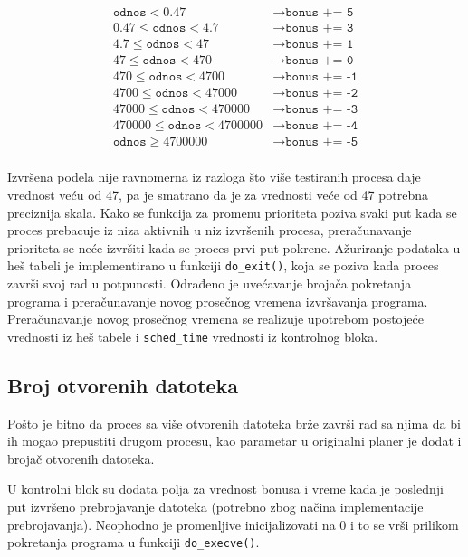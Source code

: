 \begin{align*}
    \texttt{odnos} < 0.47 & \rightarrow \texttt{bonus += 5} \\
    0.47 \leq \texttt{odnos} < 4.7 & \rightarrow \texttt{bonus += 3} \\
    4.7 \leq \texttt{odnos} < 47 & \rightarrow \texttt{bonus += 1} \\
    47 \leq \texttt{odnos} < 470 & \rightarrow \texttt{bonus += 0} \\
    470 \leq \texttt{odnos} < 4700 & \rightarrow \texttt{bonus += -1} \\
    4700 \leq \texttt{odnos} < 47000 & \rightarrow \texttt{bonus += -2} \\
    47000 \leq \texttt{odnos} < 470000 & \rightarrow \texttt{bonus += -3} \\
    470000 \leq \texttt{odnos} < 4700000 & \rightarrow \texttt{bonus += -4} \\
    \texttt{odnos} \geq 4700000 & \rightarrow \texttt{bonus += -5} \\
\end{align*}

Izvršena podela nije ravnomerna iz razloga što više testiranih procesa daje vrednost veću od
47, pa je smatrano da je za vrednosti veće od 47 potrebna preciznija skala. Kako se funkcija
za promenu prioriteta poziva svaki put kada se proces prebacuje iz niza aktivnih u niz
izvršenih procesa, preračunavanje prioriteta se neće izvršiti kada se proces prvi put pokrene.
Ažuriranje podataka u heš tabeli je implementirano u funkciji \verb|do_exit()|, koja se poziva
kada proces završi svoj rad u potpunosti. Odrađeno je uvećavanje brojača pokretanja
programa i preračunavanje novog prosečnog vremena izvršavanja programa. Preračunavanje
novog prosečnog vremena se realizuje upotrebom postojeće vrednosti iz heš tabele i
\verb|sched_time| vrednosti iz kontrolnog bloka.

\subsection{Broj otvorenih datoteka}

Pošto je bitno da proces sa više otvorenih datoteka brže završi rad sa njima da bi ih mogao
prepustiti drugom procesu, kao parametar u originalni planer je dodat i brojač otvorenih
datoteka.

U kontrolni blok su dodata polja za vrednost bonusa i vreme kada je poslednji put izvršeno
prebrojavanje datoteka (potrebno zbog načina implementacije prebrojavanja). Neophodno je
promenljive inicijalizovati na 0 i to se vrši prilikom pokretanja programa u funkciji
\verb|do_execve()|.

